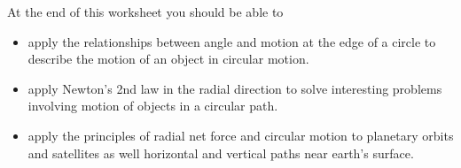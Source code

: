 At the end of this worksheet you should be able to  
\begin{itemize}
	\item apply the relationships between angle and motion at the edge of a circle to describe the motion of an object in circular motion.
	\item apply Newton's 2nd law in the radial direction to solve interesting problems involving motion of objects in a circular path.
	\item apply the principles of radial net force and circular motion to planetary orbits and satellites as well horizontal and vertical paths near earth's surface.
\end{itemize}

